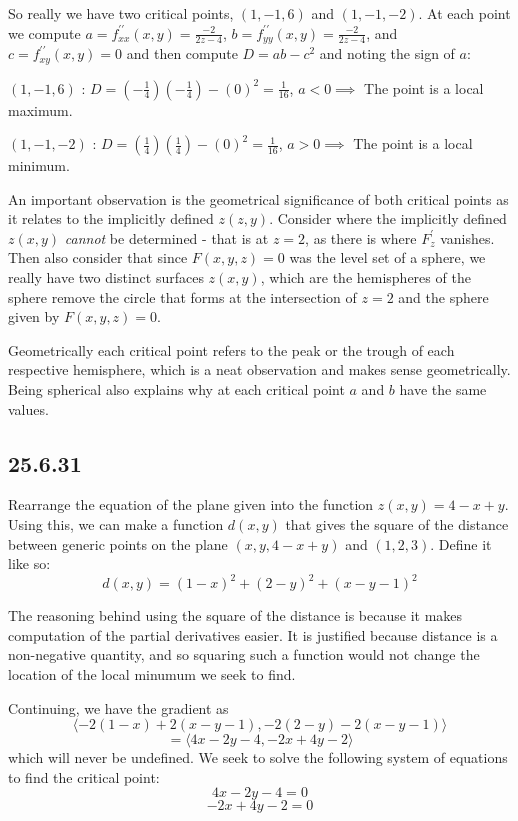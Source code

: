 \documentclass{article}
\begin{document}
So really we have two critical points, $(1,-1,6)$ and $(1,-1,-2)$. At each point we compute $a = f^{\prime \prime}_{xx}(x,y) = \frac{-2}{2z-4}$, $b = f^{\prime \prime}_{yy}(x,y) = \frac{-2}{2z-4}$, and $c = f^{\prime \prime}_{xy}(x,y) = 0$ and then compute $D = ab-c^2$ and noting the sign of $a$:

$(1,-1,6)$ : $D = (-\frac{1}{4})(-\frac{1}{4})-(0)^2 = \frac{1}{16}$, $a < 0 \implies$ The point is a local maximum.

$(1,-1,-2)$ : $D = (\frac{1}{4})(\frac{1}{4})-(0)^2 = \frac{1}{16}$, $a > 0 \implies$ The point is a local minimum.

An important observation is the geometrical significance of both critical points as it relates to the implicitly defined $z(z,y)$. Consider where the implicitly defined $z(x,y)$ \textit{cannot} be determined - that is at $z = 2$, as there is where $F^{\prime}_z$ vanishes. Then also consider that since $F(x,y,z) = 0$ was the level set of a sphere, we really have two distinct surfaces $z(x,y)$, which are the hemispheres of the sphere remove the circle that forms at the intersection of $z = 2$ and the sphere given by $F(x,y,z) = 0$. 

Geometrically each critical point refers to the peak or the trough of each respective hemisphere, which is a neat observation and makes sense geometrically. Being spherical also explains why at each critical point $a$ and $b$ have the same values.

\subsection{25.6.31}

Rearrange the equation of the plane given into the function $z(x,y) = 4-x+y$. Using this, we can make a function $d(x,y)$ that gives the square of the distance between generic points on the plane $(x,y,4-x+y)$ and $(1,2,3)$. Define it like so:
$$d(x,y) = (1-x)^2+(2-y)^2+(x-y-1)^2$$

The reasoning behind using the square of the distance is because it makes computation of the partial derivatives easier. It is justified because distance is a non-negative quantity, and so squaring such a function would not change the location of the local minumum we seek to find.

Continuing, we have the gradient as $$\langle -2(1-x) + 2(x-y-1),-2(2-y) - 2(x-y-1) \rangle$$
$$ = \langle 4x-2y-4,-2 x + 4 y - 2 \rangle$$ which will never be undefined. We seek to solve the following system of equations to find the critical point:
$$4x - 2y - 4 = 0$$
$$-2x + 4y - 2 = 0$$
\end{document}
